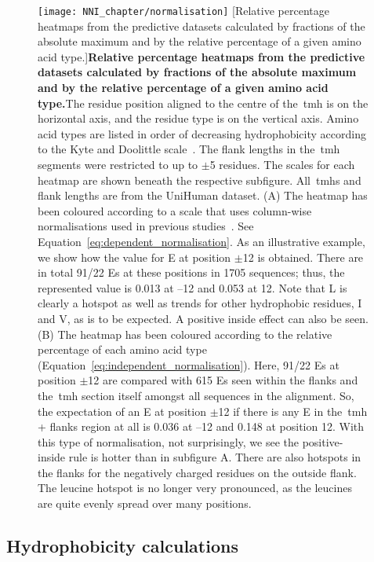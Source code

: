 \begin{figure}[!ht]
\centering
\texttt{[image: NNI\_chapter/normalisation]}
[Relative percentage heatmaps from the predictive datasets calculated by fractions of the absolute maximum and by the relative percentage of a given amino acid type.]{\textbf{Relative percentage heatmaps from the predictive datasets calculated by fractions of the absolute maximum and by the relative percentage of a given amino acid type.}The residue position aligned to the centre of the~\gls{tmh} is on the horizontal axis, and the residue type is on the vertical axis.
Amino acid types are listed in order of decreasing hydrophobicity according to the Kyte and Doolittle scale~\cite{Kyte1982}.
The flank lengths in the~\gls{tmh} segments were restricted to up to $\pm$5 residues.
The scales for each heatmap are shown beneath the respective subfigure.
All~\gls{tmh}s and flank lengths are from the UniHuman dataset.
(A) The heatmap has been coloured according to a scale that uses column-wise normalisations used in previous studies~\cite{Sharpe2010}.
See Equation~\ref{eq:dependent_normalisation}.
As an illustrative example, we show how the value for E at position $\pm$12 is obtained.
There are in total 91/22 Es at these positions in 1705 sequences; thus, the represented value is 0.013 at –12 and 0.053 at 12.
Note that L is clearly a hotspot as well as trends for other hydrophobic residues, I and V, as is to be expected.
A positive inside effect can also be seen.
(B) The heatmap has been coloured according to the relative percentage of each amino acid type (Equation~\ref{eq:independent_normalisation}).
Here, 91/22 Es at position $\pm$12 are compared with 615 Es seen within the flanks and the~\gls{tmh} section itself amongst all sequences in the alignment.
So, the expectation of an E at position $\pm$12 if there is any E in the~\gls{tmh} + flanks region at all is 0.036 at –12 and 0.148 at position 12.
With this type of normalisation, not surprisingly, we see the positive-inside rule is hotter than in subfigure A.
There are also hotspots in the flanks for the negatively charged residues on the outside flank.
The leucine hotspot is no longer very pronounced, as the leucines are quite evenly spread over many positions.}

\label{fig:normalisation}
\end{figure}

\subsection{Hydrophobicity calculations}

